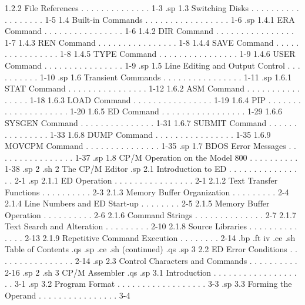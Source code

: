        1.2.2  File References  . . . . . . . . . . . . . .   1-3
.sp
   1.3  Switching Disks . . . . . . . . . . . . . . . . . .   1-5
   1.4  Built-in Commands . . . . . . . . . . . . . . . . .   1-6
.sp
        1.4.1  ERA Command  . . . . . . . . . . . . . . . .   1-6
        1.4.2  DIR Command  . . . . . . . . . . . . . . . .   1-7
        1.4.3  REN Command  . . . . . . . . . . . . . . . .   1-8
        1.4.4  SAVE Command . . . . . . . . . . . . . . . .   1-8
        1.4.5  TYPE Command . . . . . . . . . . . . . . . .   1-9
        1.4.6  USER Command . . . . . . . . . . . . . . . .   1-9
.sp
   1.5  Line Editing and Output Control . . . . . . . . . .  1-10
.sp
   1.6  Transient Commands  . . . . . . . . . . . . . . . .  1-11
.sp
        1.6.1  STAT Command . . . . . . . . . . . . . . . .  1-12
        1.6.2  ASM Command  . . . . . . . . . . . . . . . .  1-18
        1.6.3  LOAD Command . . . . . . . . . . . . . . . .  1-19
        1.6.4  PIP  . . . . . . . . . . . . . . . . . . . .  1-20
        1.6.5  ED Command . . . . . . . . . . . . . . . . .  1-29
        1.6.6  SYSGEN Command . . . . . . . . . . . . . . .  1-31
        1.6.7  SUBMIT Command . . . . . . . . . . . . . . .  1-33
        1.6.8  DUMP Command . . . . . . . . . . . . . . . .  1-35
        1.6.9  MOVCPM Command . . . . . . . . . . . . . . .  1-35
.sp
   1.7  BDOS Error Messages . . . . . . . . . . . . . . . .  1-37
.sp
   1.8  CP/M Operation on the Model 800 . . . . . . . . . .  1-38
.sp 2
.sh
2  The CP/M Editor
.sp
   2.1  Introduction to ED  . . . . . . . . . . . . . . . .   2-1
.sp
        2.1.1  ED Operation . . . . . . . . . . . . . . . .   2-1
        2.1.2  Text Transfer Functions  . . . . . . . . . .   2-3
        2.1.3  Memory Buffer Organization . . . . . . . . .   2-4
        2.1.4  Line Numbers and ED Start-up . . . . . . . .   2-5
        2.1.5  Memory Buffer Operation  . . . . . . . . . .   2-6
        2.1.6  Command Strings  . . . . . . . . . . . . . .   2-7
        2.1.7  Text Search and Alteration . . . . . . . . .  2-10
        2.1.8  Source Libraries . . . . . . . . . . . . . .  2-13
        2.1.9  Repetitive Command Execution . . . . . . . .  2-14
.bp
.ft                                iv
.ce
.sh
Table of Contents
.qs
.sp
.ce
.sh
(continued)
.qs
.sp 3
   2.2  ED Error Conditions . . . . . . . . . . . . . . . .  2-14
.sp
   2.3  Control Characters and Commands . . . . . . . . . .  2-16
.sp 2
.sh
3  CP/M Assembler
.qs
.sp
   3.1  Introduction  . . . . . . . . . . . . . . . . . . .   3-1
.sp
   3.2  Program Format  . . . . . . . . . . . . . . . . . .   3-3
.sp
   3.3  Forming the Operand . . . . . . . . . . . . . . . .   3-4
